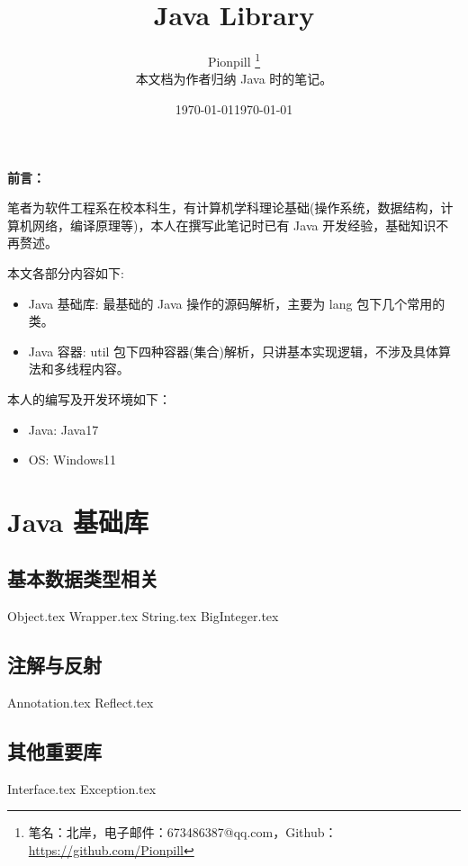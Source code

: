 \documentclass{PionpillNote-book}
\title{Java Library}
\author{
    Pionpill \footnote{笔名：北岸，电子邮件：673486387@qq.com，Github：\url{https://github.com/Pionpill}} \\
    本文档为作者归纳 Java 时的笔记。\\
}
\date{\today}
\begin{document}
\pagestyle{plain}
\maketitle

\noindent\textbf{前言：}

笔者为软件工程系在校本科生，有计算机学科理论基础(操作系统，数据结构，计算机网络，编译原理等)，本人在撰写此笔记时已有 Java 开发经验，基础知识不再赘述。

本文各部分内容如下:
\begin{itemize}
    \item Java 基础库: 最基础的 Java 操作的源码解析，主要为 lang 包下几个常用的类。
    \item Java 容器: util 包下四种容器(集合)解析，只讲基本实现逻辑，不涉及具体算法和多线程内容。
\end{itemize}

本人的编写及开发环境如下：
\begin{itemize}
    \item Java: Java17
    \item OS: Windows11
\end{itemize}

\date{\today}
\newpage

\tableofcontents

\newpage

\setcounter{page}{1} 
\pagestyle{fancy}

\part{Java 基础库}
\chapter{基本数据类型相关}
{Object.tex}
{Wrapper.tex}
{String.tex}
{BigInteger.tex}
\chapter{注解与反射}
{Annotation.tex}
{Reflect.tex}
\chapter{其他重要库}
{Interface.tex}
{Exception.tex}
\end{document}
